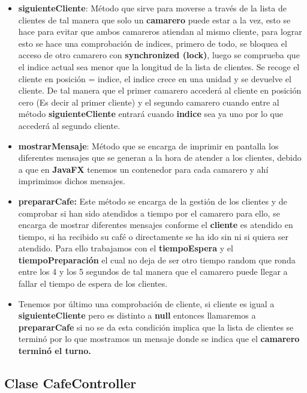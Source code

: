 \documentclass{article}
\begin{document}
\begin{itemize}
    \item \textbf{siguienteCliente}: Método que sirve para moverse a través de la lista de clientes de tal manera que solo un \textbf{camarero} puede estar a la vez, esto se hace para evitar que ambos camareros atiendan al mismo cliente, para lograr esto se hace una comprobación de indices, primero de todo, se bloquea el acceso de otro camarero con \textbf{synchronized (lock)}, luego se comprueba que el indice actual sea menor que la longitud de la lista de clientes.  Se recoge el cliente en posición = indice, el indice crece en una unidad y se devuelve el cliente. De tal manera que el primer camarero accederá al cliente en posición cero (Es decir al primer cliente) y el segundo camarero cuando entre al método \textbf{siguienteCliente} entrará cuando \textbf{indice} sea ya uno por lo que accederá al segundo cliente.
    \item \textbf{mostrarMensaje}: Método que se encarga de imprimir en pantalla los diferentes mensajes que se generan a la hora de atender a los clientes, debido a que en \textbf{JavaFX} tenemos un contenedor para cada camarero y ahí imprimimos dichos mensajes.
    \item \textbf{prepararCafe:} Este método se encarga de la gestión de los clientes y de comprobar si han sido atendidos a tiempo por el camarero para ello, se encarga de mostrar diferentes mensajes conforme el \textbf{cliente} es atendido en tiempo, si ha recibido su café o directamente se ha ido sin ni si quiera ser atendido. Para ello trabajamos con el \textbf{tiempoEspera} y el \textbf{tiempoPreparación} el cual no deja de ser otro tiempo random que ronda entre los 4 y los 5 segundos de tal manera que el camarero puede llegar a fallar el tiempo de espera de los clientes.
    \item Tenemos por último una comprobación de cliente, si cliente es igual a \textbf{siguienteCliente} pero es distinto a \textbf{null} entonces llamaremos a \textbf{prepararCafe} si no se da esta condición implica que la lista de clientes se terminó por lo que mostramos un mensaje donde se indica que el \textbf{camarero terminó el turno.}
\end{itemize}



\subsection{Clase CafeController}
\end{document}
